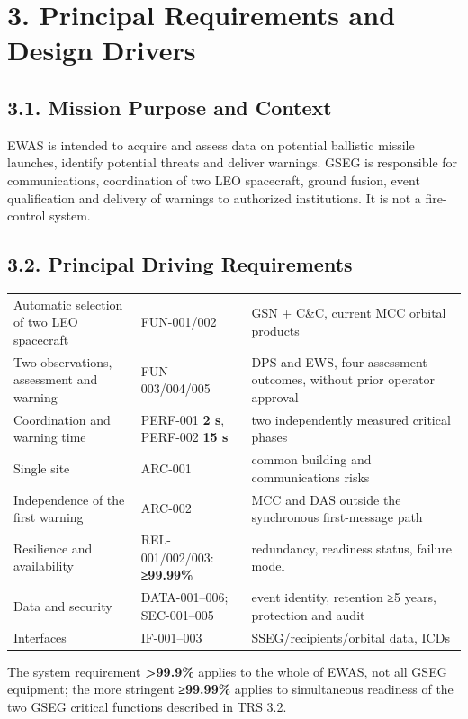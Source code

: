\section{3. Principal Requirements and Design Drivers}\label{principal-requirements-and-design-drivers}

\subsection{3.1. Mission Purpose and Context}\label{mission-purpose-and-system-context}

EWAS is intended to acquire and assess data on potential ballistic missile launches, identify potential threats and deliver warnings. GSEG is responsible for communications, coordination of two LEO spacecraft, ground fusion, event qualification and delivery of warnings to authorized institutions. It is not a fire-control system.

\subsection{3.2. Principal Driving Requirements}\label{principal-design-requirements}

\begingroup{}
\begin{longtable}{|P{0.22}|P{0.29}|P{0.49}|}
\hline{}
 &  & \\ \hline
\endhead
\hline\endlastfoot
Automatic selection of two LEO spacecraft & FUN-001/\allowbreak{}002 & GSN + C\&C, current MCC orbital products\\ \hline
Two observations, assessment and warning & FUN-003/\allowbreak{}004/\allowbreak{}005 & DPS and EWS, four assessment outcomes, without prior operator approval\\ \hline
Coordination and warning time & PERF-001 \textbf{2 s}, PERF-002 \textbf{15 s} & two independently measured critical phases\\ \hline
Single site & ARC-001 & common building and communications risks\\ \hline
Independence of the first warning & ARC-002 & MCC and DAS outside the synchronous first-message path\\ \hline
Resilience and availability & REL-001/\allowbreak{}002/\allowbreak{}003: \textbf{≥99.99\%} & redundancy, readiness status, failure model\\ \hline
Data and security & DATA-001–006; SEC-001–005 & event identity, retention ≥5 years, protection and audit\\ \hline
Interfaces & IF-001–003 & SSEG/\allowbreak{}recipients/\allowbreak{}orbital data, ICDs\\*
\end{longtable}
\endgroup

The system requirement \textbf{>99.9\%} applies to the whole of EWAS, not all GSEG equipment; the more stringent \textbf{≥99.99\%} applies to simultaneous readiness of the two GSEG critical functions described in TRS 3.2.
